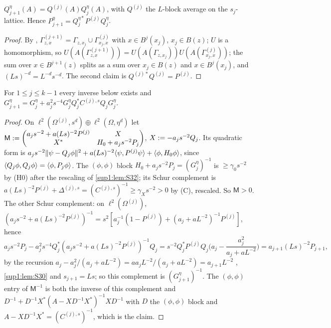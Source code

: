 \begin{lemma}\label{sup1:lem:S30}
$Q^\eta_{j+1}(A)=Q^{(j)}(A)Q^\eta_j(A)$, with $Q^{(j)}$ the $L$-block average on the $s_j$-lattice. Hence $P^\eta_{j+1}=Q^{\eta*}_jP^{(j)}Q^\eta_j$.
\end{lemma}

\begin{proof}
By \cite[(2.2)]{Ba1}, $\Gamma^{(j+1)}_{z,x}=\Gamma_{z,x_j}\cup\Gamma^{(j)}_{x_j,x}$ with $x\in B^j(x_j)$, $x_j\in B(z)$; $U$ is a homomorphism, so $U(A(\Gamma^{(j+1)}_{z,x}))=U(A(\Gamma_{z,x_j}))U(A(\Gamma^{(j)}_{x_j,x}))$; the sum over $x\in B^{j+1}(z)$ splits as a sum over $x_j\in B(z)$ and $x\in B^j(x_j)$, and $(Ls)^{-d}=L^{-d}s^{-d}$. The second claim is $Q^{(j)*}Q^{(j)}=P^{(j)}$.
\end{proof}

\begin{lemma}\label{sup1:lem:S31}
For $1\le j\le k-1$ every inverse below exists and $G^\eta_{j+1}=G^\eta_j+a_j^2s^{-4}G^\eta_jQ_j^*C^{(j),s}Q_jG^\eta_j$.
\end{lemma}

\begin{proof}
On $\ell^2(\Omega^{(j)},s^d)\oplus\ell^2(\Omega,\eta^d)$ let $\mathsf M:=\begin{pmatrix}a_js^{-2}+a(Ls)^{-2}P^{(j)}&X\\X^*&H_0+a_js^{-2}P_j\end{pmatrix}$, $X:=-a_js^{-2}Q_j$. Its quadratic form is $a_js^{-2}\lVert \psi-Q_j\phi\rVert^2+a(Ls)^{-2}\langle \psi,P^{(j)}\psi\rangle+\langle \phi,H_0\phi\rangle$, since $\langle Q_j\phi,Q_j\phi\rangle=\langle \phi,P_j\phi\rangle$. The $(\phi,\phi)$ block $H_0+a_js^{-2}P_j=(G^\eta_j)^{-1}$ is $\ge\gamma_0s^{-2}$ by (H0) after the rescaling of \cref{sup1:lem:S32}; its Schur complement is $a(Ls)^{-2}P^{(j)}+\Delta^{(j),s}=(C^{(j),s})^{-1}\ge\gamma_Xs^{-2}>0$ by (C), rescaled. So $\mathsf M>0$. The other Schur complement: on $\ell^2(\Omega^{(j)})$, $(a_js^{-2}+a(Ls)^{-2}P^{(j)})^{-1}=s^2[a_j^{-1}(1-P^{(j)})+(a_j+aL^{-2})^{-1}P^{(j)}]$, hence
\[
a_js^{-2}P_j-a_j^2s^{-4}Q_j^*(a_js^{-2}+a(Ls)^{-2}P^{(j)})^{-1}Q_j=s^{-2}Q_j^*P^{(j)}Q_j\Big(a_j-\frac{a_j^2}{a_j+aL^{-2}}\Big)=a_{j+1}(Ls)^{-2}P_{j+1},
\]
by the recursion $a_j-a_j^2/(a_j+aL^{-2})=aa_jL^{-2}/(a_j+aL^{-2})=a_{j+1}L^{-2}$ \cite[(2.13)]{Ba1}, \cref{sup1:lem:S30} and $s_{j+1}=Ls$; so this complement is $(G^\eta_{j+1})^{-1}$. The $(\phi,\phi)$ entry of $\mathsf M^{-1}$ is both the inverse of this complement and $D^{-1}+D^{-1}X^*(A-XD^{-1}X^*)^{-1}XD^{-1}$ with $D$ the $(\phi,\phi)$ block and $A-XD^{-1}X^*=(C^{(j),s})^{-1}$, which is the claim.
\end{proof}

